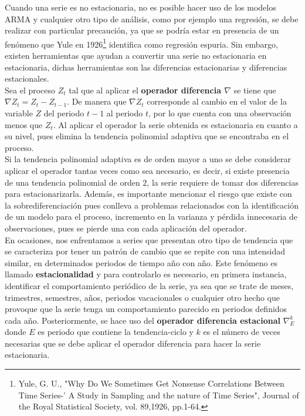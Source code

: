 Cuando una serie es no estacionaria, no es posible hacer uso de los modelos ARMA y cualquier otro tipo de análisis, como por ejemplo una regresión, se debe realizar con particular precaución, ya que se podría estar en presencia de un fenómeno que Yule en 1926\footnote{Yule, G. U., "Why Do We Sometimes Get Nonsense Correlations Between Time Series-' A Study in Sampling and the nature of Time Series", Journal of the Royal Statistical Society, vol. 89,1926, pp.1-64.} identifica como regresión espuria. Sin embargo, existen herramientas que ayudan a convertir una serie no estacionaria en estacionaria, dichas herramientas son las diferencias estacionarias y diferencias estacionales.\\

Sea el proceso $Z_t$ tal que al aplicar el \textbf{operador diferencia $\nabla$ } se tiene que  $\nabla Z_t=Z_t-Z_{t-1}$. De manera que $\nabla Z_t$ corresponde al cambio en el valor de la variable $Z$ del periodo $t-1$ al periodo $t$, por lo que cuenta con una observación menos que $Z_t$. Al aplicar el operador la serie obtenida es estacionaria en cuanto a su nivel, pues elimina la tendencia polinomial adaptiva que se encontraba en el proceso. \\

Si la tendencia polinomial adaptiva es de orden mayor a uno se debe considerar aplicar el operador tantas veces como sea necesario, es decir, si existe presencia de una tendencia polinomial de orden $2$, la serie requiere de tomar dos diferencias para estacionarizarla. Además, es importante mencionar el riesgo que existe con la sobrediferenciación pues conlleva a problemas relacionados con la identificación de un modelo para el proceso, incremento en la varianza y p\'erdida innecesaria de observaciones, pues se pierde una con cada aplicación del operador.\\

En ocasiones, nos enfrentamos a series que presentan otro tipo de tendencia que se caracteriza por tener un patrón de cambio que se repite con una intensidad similar, en determinados periodos de tiempo a\~no con a\~no. Este fenómeno es llamado \textbf{estacionalidad} y para controlarlo es necesario, en primera instancia, identificar el comportamiento periódico de la serie, ya sea que se trate de meses, trimestres, semestres, años, periodos vacacionales o cualquier otro hecho que provoque que la serie tenga un comportamiento parecido  en periodos definidos cada a\~no. Posteriormente, se hace uso del \textbf{ operador diferencia estacional}  $\nabla_{E}^{k}$  donde $E$ es periodo que contiene la tendencia-ciclo y $k$ es el número de veces necesarias que se debe aplicar el operador diferencia para hacer la serie estacionaria.\\

